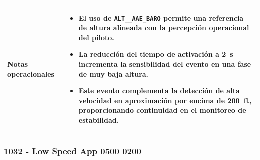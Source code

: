 \documentclass[11pt,a4paper]{article}
\begin{document}
\begin{longtable}{p{5cm} p{9.5cm}}
		\textbf{Notas operacionales} &
		\begin{itemize}
			\item El uso de \texttt{ALT\_\_AAE\_BARO} permite una referencia de altura alineada con la percepción operacional del piloto.
			\item La reducción del tiempo de activación a \SI{2}{s} incrementa la sensibilidad del evento en una fase de muy baja altura.
			\item Este evento complementa la detección de alta velocidad en aproximación por encima de \SI{200}{ft}, proporcionando continuidad en el monitoreo de estabilidad.
		\end{itemize} \\
		\hline
		
	\end{longtable}\newpage
	
	\subsubsection{1032 - Low Speed App 0500 0200}
	
\end{document}
